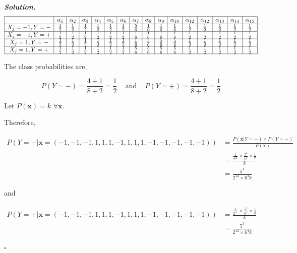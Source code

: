 \documentclass[8pt]{article}
\newenvironment{solution}[1][\it{Solution}]{\textbf{#1. } }{$\square$}
\begin{document}
\begin{solution}
$$
\begin{array}{|c|c|c|c|c|c|c|c|c|c|c|c|c|c|c|c|}
\hline & \alpha_{1} & \alpha_{2} & \alpha_{3} & \alpha_{4} & \alpha_{5} & \alpha_{6} & \alpha_{7} & \alpha_{8} & \alpha_{9} & \alpha_{10} & \alpha_{12} & \alpha_{12} & \alpha_{13} & \alpha_{14} & \alpha_{15} \\
\hline X_j = -1, Y = - & \frac{1}{2} & \frac{1}{2} & \frac{1}{2} & \frac{1}{2} & \frac{1}{2} & \frac{1}{2} & \frac{5}{6} & \frac{1}{6} & \frac{1}{6} & \frac{1}{6} & \frac{1}{2} & \frac{1}{2} & \frac{1}{2} & \frac{1}{2} & \frac{1}{2} \\
\hline X_j = -1, Y = + & \frac{1}{2} & \frac{1}{2} & \frac{1}{2} & \frac{1}{2} & \frac{1}{2} & \frac{1}{2} & \frac{1}{6} & \frac{1}{6} & \frac{1}{6} & \frac{1}{6} & \frac{1}{2} & \frac{1}{2} & \frac{1}{2} & \frac{1}{2} & \frac{1}{2} \\
\hline X_j = 1, Y = - & \frac{1}{2} & \frac{1}{2} & \frac{1}{2} & \frac{1}{2} & \frac{1}{2} & \frac{1}{2} & \frac{1}{6} & \frac{5}{6} & \frac{5}{6} & \frac{5}{6} & \frac{1}{2} & \frac{1}{2} & \frac{1}{2} & \frac{1}{2} & \frac{1}{2} \\
\hline X_j = 1, Y = + & \frac{1}{2} & \frac{1}{2} & \frac{1}{2} & \frac{1}{2} & \frac{1}{2} & \frac{1}{2} & \frac{5}{6} & \frac{5}{6} & \frac{5}{6} & \frac{5}{6} & \frac{1}{2} & \frac{1}{2} & \frac{1}{2} & \frac{1}{2} & \frac{1}{2} \\
\hline
\end{array}
$$


The class probabilities are,

$$
    P(Y = -) = \frac{4 + 1}{8 + 2} = \frac{1}{2} \,\,\,\,\,\,\,\text{and}\,\,\,\,\,\,\, P(Y = +) = \frac{4 + 1}{8 + 2} = \frac{1}{2}
$$

Let $P(\boldsymbol{x}) = k$ $\forall \boldsymbol{x}$.

Therefore,

$$
\begin{aligned}
P(Y = - | \boldsymbol{x} = (-1, -1, -1, 1, 1, 1, -1, 1, 1, 1, -1, -1, -1, -1, -1)) &= \frac{P(\boldsymbol{x} | Y = -) \times P(Y = -)}{P(\boldsymbol{x})}\\
&= \frac{\frac{1}{2^{11}}\times\frac{5^4}{6^4}\times\frac{1}{2}}{k}\\
&= \frac{5^4}{2^{12} \times 6^4k}
\end{aligned}
$$

and

$$
\begin{aligned}
P(Y = + | \boldsymbol{x} = (-1, -1, -1, 1, 1, 1, -1, 1, 1, 1, -1, -1, -1, -1, -1)) &= \frac{\frac{1}{2^{11}}\times\frac{5^3}{6^4}\times\frac{1}{2}}{k}\\
&= \frac{5^3}{2^{12} \times 6^4k}
\end{aligned}
$$


\end{solution}
\end{document}
